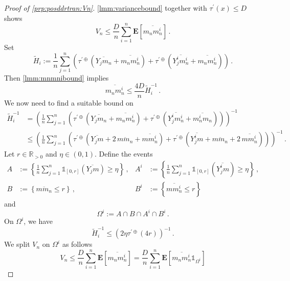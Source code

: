 \documentclass{article}
\newcommand{\R}{\mathbb{R}}
\newcommand{\Rpp}{\R_{>0}}
\newcommand{\lcb}{\left\lbrace} %
\newcommand{\rcb}{\right\rbrace} %
\newcommand{\cb}[1]{\lcb #1 \rcb} %
\newcommand{\lab}{\left[} %
\newcommand{\rab}{\right]} %
\newcommand{\ab}[1]{\lab #1 \rab} %
\newcommand{\abOf}[1]{\!\ab{#1}} %
\newcommand{\lb}{\left(} %
\newcommand{\rb}{\right)} %
\newcommand{\br}[1]{\lb #1 \rb} %
\newcommand{\E}{\mathbf{E}} %
\newcommand{\EOf}[1]{\E\abOf{#1}}
\newcommand{\pr}{^\prime}
\newcommand{\ind}{\mathds{1}}%
\newcommand{\eqcm}{\,,} %
\newcommand{\eqfs}{\,.}
\newcommand{\ol}[2]{\overline{#1#2}}
\newcommand{\dtran}{\tau\pr}
\newcommand{\ddrtran}{\tau^{\prime\oplus}}
\begin{document}
%
\begin{proof}[Proof of \cref{prp:posddrtran:Vn}]
    \cref{lmm:variancebound} together with $\dtran(x) \leq D$ shows
    \begin{equation}
        V_n \leq \frac{D}n \sum_{i=1}^n \EOf{\ol {m_n}{m_n^i}}
        \eqfs
    \end{equation}
    Set
    \begin{equation}
        \tilde H_i := \frac1n \sum_{j=1}^n \br{\ddrtran(\ol {Y_j}{m_n} + \ol {m_n}{m_n^{i}}) + \ddrtran(\ol {Y_j^{i}}{m_n^{i}} + \ol {m_n}{m_n^{i}})}
        \eqfs
    \end{equation}
    Then \cref{lmm:mnmnibound} implies
    \begin{equation}
        \ol {m_n}{m_n^{i}} \leq \frac {4 D}n \tilde H_i^{-1}
        \eqfs
    \end{equation}
    We now need to find a suitable bound on
    \begin{align}
        \tilde H_i^{-1} 
        &= 
        \br{\frac1n \sum_{j=1}^n \br{\ddrtran(\ol {Y_j}{m_n} + \ol {m_n}{m_n^{i}}) + \ddrtran(\ol {Y_j^{i}}{m_n^{i}} + \ol {m_n^{i}}{m_n})}}^{-1}
        \\&\leq
        \br{\frac1n \sum_{j=1}^n \br{\ddrtran(\ol {Y_j}{m} + 2\,\ol m{m_n} + \ol {m}{m_n^{i}}) + \ddrtran(\ol {Y_j^{i}}{m} +  \ol m{m_n} + 2\,\ol {m}{m_n^{i}})}}^{-1}
        \eqfs
    \end{align}
    Let $r\in \Rpp$ and $\eta \in (0,1)$. Define the events
    \begin{align}
        A &:= \cb{\frac1n \sum_{j=1}^n \ind_{[0, r]}(\ol {Y_j}{m}) \geq \eta}\eqcm
        &
        A^i &:= \cb{\frac1n \sum_{j=1}^n \ind_{[0, r]}(\ol {Y_j^i}{m}) \geq \eta}\eqcm
        \\
        B &:= \cb{\ol m{m_n} \leq r}\eqcm
        &
        B^i &:= \cb{\ol m{m_n^i} \leq r}
    \end{align}
    and
    \begin{equation}
        \Omega^i := A \cap B \cap A^i \cap B^i\eqfs
    \end{equation}
    On $\Omega^i$, we have
    \begin{equation}
        \tilde H_i^{-1} \leq \br{2\eta\ddrtran(4r)}^{-1}
        \eqfs
    \end{equation}
    We split $V_n$ on $\Omega^i$ as follows
    \begin{equation}
        V_n
        \leq 
        \frac D{n}\sum_{i=1}^n \EOf{\ol{m_n}{m_n^{i}}}
        =
        \frac D{n}\sum_{i=1}^n \EOf{\ol{m_n}{m_n^{i}} \ind_{\Omega^i}}

\end{equation}
\end{proof}
\end{document}
